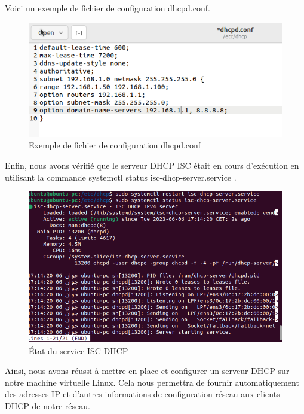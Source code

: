Voici un exemple de fichier de configuration dhcpd.conf.\\

\begin{figure}[H]
 \centering
    \includegraphics[width=15cm]{Images/dhcp4.png}
    \caption{Exemple de fichier de configuration dhcpd.conf}
    \label{fig:dhcpd-conf-example}
\end{figure}

Enfin, nous avons vérifié que le serveur DHCP ISC était en cours d'exécution en utilisant la commande systemctl status isc-dhcp-server.service .\\

\begin{figure}[H]
 \centering
    \includegraphics[width=15cm]{Images/dhcp5.png}
    \caption{État du service ISC DHCP}
    \label{fig:isc-dhcp-service-status}
\end{figure}

Ainsi, nous avons réussi à mettre en place et configurer un serveur DHCP sur notre machine virtuelle Linux. Cela nous permettra de fournir automatiquement des adresses IP et d'autres informations de configuration réseau aux clients DHCP de notre réseau. \\



